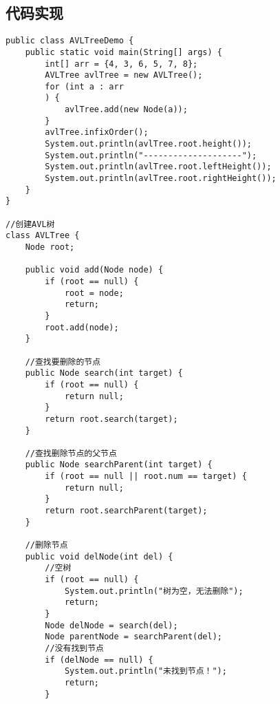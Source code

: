 \documentclass[a4paper]{report}
\begin{document}
\subsection{代码实现}
\begin{lstlisting}
public class AVLTreeDemo {
    public static void main(String[] args) {
        int[] arr = {4, 3, 6, 5, 7, 8};
        AVLTree avlTree = new AVLTree();
        for (int a : arr
        ) {
            avlTree.add(new Node(a));
        }
        avlTree.infixOrder();
        System.out.println(avlTree.root.height());
        System.out.println("--------------------");
        System.out.println(avlTree.root.leftHeight());
        System.out.println(avlTree.root.rightHeight());
    }
}

//创建AVL树
class AVLTree {
    Node root;

    public void add(Node node) {
        if (root == null) {
            root = node;
            return;
        }
        root.add(node);
    }

    //查找要删除的节点
    public Node search(int target) {
        if (root == null) {
            return null;
        }
        return root.search(target);
    }

    //查找删除节点的父节点
    public Node searchParent(int target) {
        if (root == null || root.num == target) {
            return null;
        }
        return root.searchParent(target);
    }

    //删除节点
    public void delNode(int del) {
        //空树
        if (root == null) {
            System.out.println("树为空，无法删除");
            return;
        }
        Node delNode = search(del);
        Node parentNode = searchParent(del);
        //没有找到节点
        if (delNode == null) {
            System.out.println("未找到节点！");
            return;
        }


\end{lstlisting}
\end{document}
